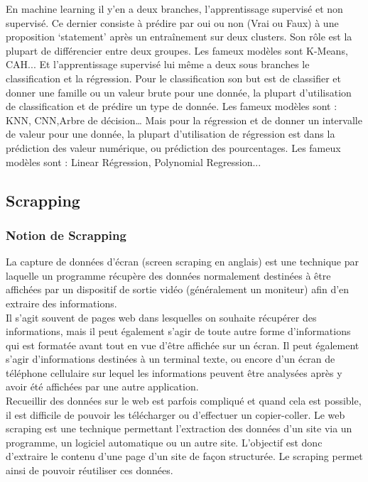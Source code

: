 \documentclass[12pt]{report}
\begin{document}
En machine learning il y’en a deux branches, l’apprentissage supervisé et non supervisé.
Ce dernier consiste à prédire par oui ou non (Vrai ou Faux) à une proposition ‘statement’ après un entraînement sur deux clusters. Son rôle est la plupart de différencier entre deux groupes. Les fameux modèles sont K-Means, CAH...
Et l’apprentissage supervisé lui même a deux sous branches le classification et la régression.
Pour le classification son but est de classifier et donner une famille ou un valeur brute pour une donnée, la plupart d’utilisation de classification et de prédire un type de donnée. Les fameux modèles sont : KNN, CNN,Arbre de décision…
Mais pour la régression et de donner un intervalle de valeur pour une donnée, la plupart d’utilisation de régression est dans la prédiction des valeur numérique, ou prédiction des pourcentages. Les fameux modèles sont : Linear Régression, Polynomial Regression...
\subsection{Scrapping}
\subsubsection{Notion de Scrapping}
La capture de données d’écran (screen scraping en anglais) est une technique par laquelle un programme récupère des données normalement destinées à être affichées par un dispositif de sortie vidéo (généralement un moniteur) afin d’en extraire des informations.\\

Il s’agit souvent de pages web dans lesquelles on souhaite récupérer des informations, mais il peut également s’agir de toute autre forme d’informations qui est formatée avant tout en vue d’être affichée sur un écran. Il peut également s’agir d’informations destinées à un terminal texte, ou encore d’un écran de téléphone cellulaire sur lequel les informations peuvent être analysées après y avoir été affichées par une autre application\cite{40}.\\

Recueillir des données sur le web est parfois compliqué et quand cela est possible, il est difficile de pouvoir les télécharger ou d’effectuer un copier-coller. Le web scraping est une technique permettant l’extraction des données d’un site via un programme, un logiciel automatique ou un autre site. L’objectif est donc d’extraire le contenu d’une page d’un site de façon structurée. Le scraping permet ainsi de pouvoir réutiliser ces données\cite{41}.\\
\end{document}
